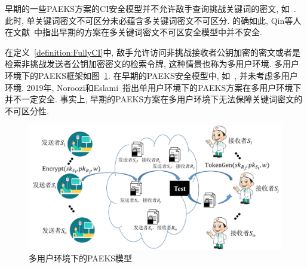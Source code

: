 \begin{note}
早期的一些PAEKS方案的CI安全模型并不允许敌手查询挑战关键词的密文, 如~\cite{HL-InfSci-2017,NE-IET-InfS-2019}. 此时, 单关键词密文不可区分未必蕴含多关键词密文不可区分. 的确如此, Qin等人在文献~\cite{Qin-Information-Science-2020,QCZZ-ProvSec-2021}中指出早期的方案在多关键词密文不可区安全模型中并不安全.
\end{note}


\begin{note}
在定义~\ref{definition:FullyCI}中, 敌手允许访问非挑战接收者公钥加密的密文或者是检索非挑战发送者公钥加密密文的检索令牌, 这种情景也称为多用户环境. 多用户环境下的PAEKS框架如图~\ref{fig:ch6-MultiUserPAEKS}. 在早期的PAEKS安全模型中, 如~\cite{HL-InfSci-2017}, 并未考虑多用户环境. 2019年, Noroozi和Eslami~\cite{NE-IET-InfS-2019}指出单用户环境下的PAEKS方案在多用户环境下并不一定安全. 事实上, 早期的PAEKS方案在多用户环境下无法保障关键词密文的不可区分性.
\begin{figure}[h]
\centering
\includegraphics[scale = 0.5]{figure/ch6-MultiUserPAEKS.png}
\caption{多用户环境下的PAEKS模型} \label{fig:ch6-MultiUserPAEKS}
\end{figure}
\end{note}

